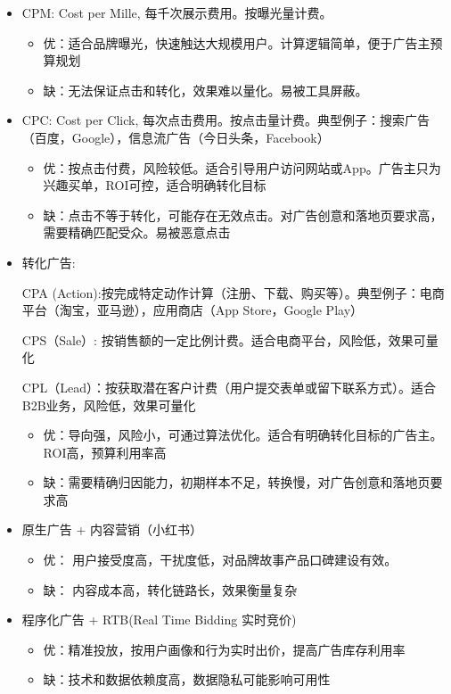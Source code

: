 \documentclass{article}
\begin{document}
\begin{itemize}
    \item CPM: Cost per Mille, 每千次展示费用。按曝光量计费。
    \begin{itemize}
        \item 优：适合品牌曝光，快速触达大规模用户。计算逻辑简单，便于广告主预算规划
        \item 缺：无法保证点击和转化，效果难以量化。易被工具屏蔽。
    \end{itemize}

    \item CPC: Cost per Click, 每次点击费用。按点击量计费。典型例子：搜索广告（百度，Google），信息流广告（今日头条，Facebook）
    \begin{itemize}
        \item 优：按点击付费，风险较低。适合引导用户访问网站或App。广告主只为兴趣买单，ROI可控，适合明确转化目标
        \item 缺：点击不等于转化，可能存在无效点击。对广告创意和落地页要求高，需要精确匹配受众。易被恶意点击
    \end{itemize}

    \item 转化广告:
    
    CPA (Action):按完成特定动作计算（注册、下载、购买等）。典型例子：电商平台（淘宝，亚马逊），应用商店（App Store，Google Play）
    
    CPS（Sale）: 按销售额的一定比例计费。适合电商平台，风险低，效果可量化

    CPL（Lead）：按获取潜在客户计费（用户提交表单或留下联系方式）。适合B2B业务，风险低，效果可量化
    \begin{itemize}
        \item 优：导向强，风险小，可通过算法优化。适合有明确转化目标的广告主。ROI高，预算利用率高
        \item 缺：需要精确归因能力，初期样本不足，转换慢，对广告创意和落地页要求高
    \end{itemize}

    \item 原生广告 + 内容营销（小红书）
    \begin{itemize}
        \item 优： 用户接受度高，干扰度低，对品牌故事产品口碑建设有效。
        \item 缺： 内容成本高，转化链路长，效果衡量复杂
    \end{itemize}

    \item  程序化广告 + RTB(Real Time Bidding 实时竞价)
    \begin{itemize}
        \item 优：精准投放，按用户画像和行为实时出价，提高广告库存利用率
        \item 缺：技术和数据依赖度高，数据隐私可能影响可用性


\end{itemize}
\end{itemize}
\end{document}
